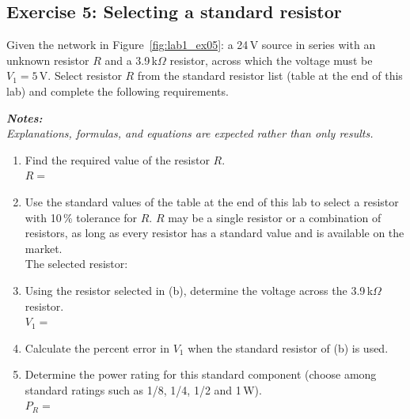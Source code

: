 

\subsection{Exercise 5: Selecting a standard resistor}
Given the network in Figure~\ref{fig:lab1_ex05}: a 24\,V source in series with an unknown resistor $R$ and a 3.9\,k$\Omega$ resistor, across which the voltage must be $V_1=5$\,V. Select resistor $R$ from the standard resistor list (table at the end of this lab) and complete the following requirements.


\textit{\textbf{Notes:}}\\
\textit{Explanations, formulas, and equations are expected rather than only results.}
\begin{enumerate}[label=\alph*.]
  \item Find the required value of the resistor $R$.\\ $R=$\dotfill
  \item Use the standard values of the table at the end of this lab to select a resistor with 10\,\% tolerance for $R$. $R$ may be a single resistor or a combination of resistors, as long as every resistor has a standard value and is available on the market.\\ The selected resistor:\dotfill
  \item Using the resistor selected in (b), determine the voltage across the 3.9\,k$\Omega$ resistor.\\ $V_1=$\dotfill
  \item Calculate the percent error in $V_1$ when the standard resistor of (b) is used.\\ \dotfill
  \item Determine the power rating for this standard component (choose among standard ratings such as 1/8, 1/4, 1/2 and 1\,W).\\ $P_R=$\dotfill
\end{enumerate}

